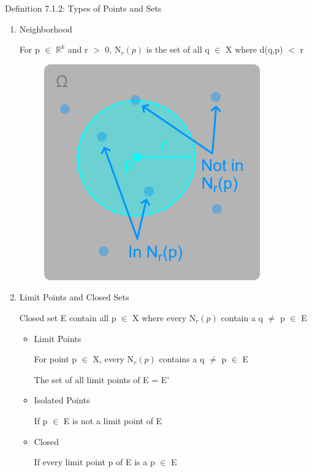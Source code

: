 { \color{blue} Definition 7.1.2: Types of Points and Sets } 
	\begin{enumerate}[label=(\alph*), leftmargin=2cm, itemsep=0.1cm]
		\item {\color{lblue} Neighborhood}

			\qquad For p $\in$ $\mathbb{R}^k$ and r $>$ 0, N$_r(p)$ is the set of all q $\in$ X
			where d(q,p) $<$ r

			\begin{figure}[h]
				\centering
				\includegraphics[scale=0.45]{Images/7.1.2a.png}
			\end{figure}

		\item {\color{lblue} Limit Points and Closed Sets}

			\hspace{0.1cm} Closed set E contain all p $\in$ X where every N$_r(p)$ contain
			a q $\neq$ p $\in$ E

			\begin{itemize}[leftmargin=1cm, itemsep=0.1cm]
				\item Limit Points 

					\qquad For point p $\in$ X, every N$_r(p)$ contains a
					q $\neq$ p $\in$ E

					\qquad The set of all limit points of E = E'
				
				\item Isolated Points

					\qquad If p $\in$ E is not a limit point of E

				\item Closed

					\qquad If every limit point p of E is a p $\in$ E
			\end{itemize}


\end{enumerate}
